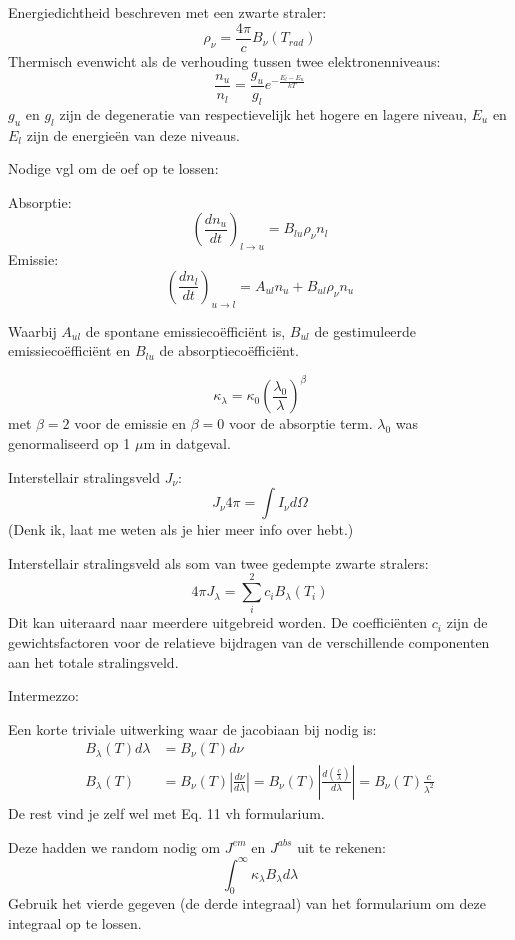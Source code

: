 \documentclass[a4paper,twoside]{article}
\theoremstyle{definition}
\theoremstyle{plain}
\begin{document}
Energiedichtheid beschreven met een zwarte straler:
\[
\rho_\nu = \frac{4 \pi}{c} B_\nu(T_{rad})
\]
Thermisch evenwicht als de verhouding tussen twee elektronenniveaus:
\[
\frac{n_u}{n_l} = \frac{g_u}{g_l} e^{-\frac{E_l - E_u}{k T}}
\]
\(g_u\) en \(g_l\) zijn de degeneratie van respectievelijk het hogere en lagere niveau,
\(E_u\) en \(E_l\) zijn de energieën van deze niveaus.

Nodige vgl om de oef op te lossen:

Absorptie:
\[
\left(\frac{dn_u}{dt}\right)_{l \to u} = B_{lu} \rho_\nu n_l
\]
Emissie:
\[
\left(\frac{dn_l}{dt}\right)_{u \to l} = A_{ul} n_u + B_{ul} \rho_\nu n_u
\]

Waarbij \(A_{ul}\) de spontane emissiecoëfficiënt is, \(B_{ul}\) de gestimuleerde emissiecoëfficiënt en \(B_{lu}\) de absorptiecoëfficiënt.

\[
\kappa_\lambda = \kappa_0 \left(\frac{\lambda_0}{\lambda}\right)^\beta
\]
met \(\beta = 2\) voor de emissie en \(\beta = 0\) voor de absorptie term. \(\lambda_0\) was genormaliseerd op 1 \(\mu \)m in datgeval.


Interstellair stralingsveld \(J_\nu\):
\begin{equation}
    J_\nu 4 \pi = \int I_\nu d\Omega
\end{equation}  
(Denk ik, laat me weten als je hier meer info over hebt.)


Interstellair stralingsveld als som van twee gedempte zwarte stralers:
\[
4\pi J_\lambda = \sum_i^2 c_i B_\lambda (T_i)
\]
Dit kan uiteraard naar meerdere uitgebreid worden.
De coefficiënten \(c_i\) zijn de gewichtsfactoren voor de relatieve bijdragen van de verschillende componenten aan het totale stralingsveld. 


Intermezzo:

Een korte triviale uitwerking waar de jacobiaan bij nodig is:
\begin{align*}
    B_\lambda(T)d\lambda &= B_\nu(T) d\nu \\
    B_\lambda(T) &= B_\nu(T) \left| \frac{d\nu}{d\lambda} \right| 
    = B_\nu(T) \left| \frac{d \left( \frac{c}{\lambda} \right) }{d\lambda} \right| 
    = B_\nu(T) \frac{c}{\lambda^2}  
\end{align*}
De rest vind je zelf wel met Eq. 11 vh formularium.




Deze hadden we random nodig om \(J^{em}\) en \(J^{abs}\) uit te rekenen:
\[
\int_{0}^{\infty}\kappa_\lambda B_\lambda d \lambda 
\]
Gebruik het vierde gegeven (de derde integraal) van het formularium om deze integraal op te lossen.
\end{document}

